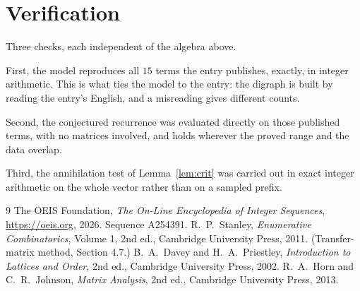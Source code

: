 \documentclass[11pt,a4paper]{article}
\theoremstyle{plain}
\theoremstyle{definition}
\begin{document}
\section{Verification}

Three checks, each independent of the algebra above.

First, the model reproduces all $15$ terms the entry publishes, exactly, in integer
arithmetic. This is what ties the model to the entry: the digraph is built by reading the
entry's English, and a misreading gives different counts.

Second, the conjectured recurrence was evaluated directly on those published terms, with no
matrices involved, and holds wherever the proved range and the data overlap.

Third, the annihilation test of Lemma~\ref{lem:crit} was carried out in exact integer
arithmetic on the whole vector rather than on a sampled prefix.

\begin{thebibliography}{9}
 The OEIS Foundation, \emph{The On-Line Encyclopedia of Integer
Sequences}, \url{https://oeis.org}, 2026. Sequence A254391.
 R.~P.~Stanley, \emph{Enumerative Combinatorics}, Volume 1, 2nd ed.,
Cambridge University Press, 2011. (Transfer-matrix method, Section 4.7.)
 B.~A.~Davey and H.~A.~Priestley, \emph{Introduction to Lattices and
Order}, 2nd ed., Cambridge University Press, 2002.
 R.~A.~Horn and C.~R.~Johnson, \emph{Matrix Analysis}, 2nd ed., Cambridge
University Press, 2013.
\end{thebibliography}
\end{document}
